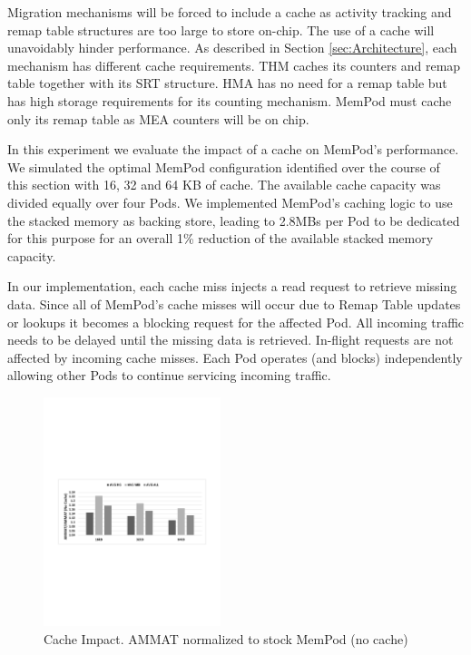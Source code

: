 Migration mechanisms will be forced to include a cache as activity tracking and remap table structures are too large to store on-chip. The use of a cache will unavoidably hinder performance. As described in Section \ref{sec:Architecture}, each mechanism has different cache requirements. THM caches its counters and remap table together with its SRT structure. HMA has no need for a remap table but has high storage requirements for its counting mechanism. MemPod must cache only its remap table as MEA counters will be on chip. 

In this experiment we evaluate the impact of a cache on MemPod's performance. We simulated the optimal MemPod configuration identified over the course of this section with 16, 32 and 64 KB of cache. The available cache capacity was divided equally over four Pods. We implemented MemPod's caching logic to use the stacked memory as backing store, leading to 2.8MBs per Pod to be dedicated for this purpose for an overall 1\% reduction of the available stacked memory capacity.

In our implementation, each cache miss injects a read request to retrieve missing data. Since all of MemPod's cache misses will occur due to Remap Table updates or lookups it becomes a blocking request for the affected Pod. All incoming traffic needs to be delayed until the missing data is retrieved. In-flight requests are not affected by incoming cache misses. Each Pod operates (and blocks) independently allowing other Pods to continue servicing incoming traffic.

\begin{figure}
  \includegraphics[width=0.46\textwidth]{figures/revised/old/cache_impact.pdf}
  \caption{Cache Impact. AMMAT normalized to stock MemPod (no cache)}
  \label{fig:cache_impact}
\end{figure}

